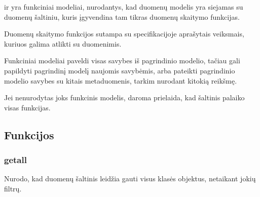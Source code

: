 \documentclass[letterpaper,10pt,lithuanian]{sphinxmanual}
\begin{document}
\sphinxAtStartPar
{} ir  yra funkciniai modeliai, nurodantys, kad
duomenų modelis  yra siejamas su duomenų šaltiniu, kuris įgyvendina tam
tikras duomenų skaitymo funkcijas.

\sphinxAtStartPar
Duomenų skaitymo funkcijos sutampa su  specifikacijoje aprašytais veiksmais,
kuriuos galima atlikti su duomenimis.

\sphinxAtStartPar
Funkciniai modeliai paveldi visas savybes iš pagrindinio modelio, tačiau gali
papildyti pagrindinį modelį naujomis savybėmis, arba pateikti pagrindinio
modelio savybes su kitais metaduomenis, tarkim nurodant kitokią
{\hyperref[\detokenize{dimensijos:property.source}]{}} reikšmę.

\sphinxAtStartPar
Jei nenurodytas joks funkcinis modelis, daroma prielaida, kad šaltinis palaiko
visas  funkcijas.


\subsection{Funkcijos}
\label{\detokenize{modeliai/funkciniai:funkcijos}}

\subsubsection{getall}
\label{\detokenize{modeliai/funkciniai:getall}}
\sphinxAtStartPar
Nurodo, kad duomenų šaltinis leidžia gauti visus klasės objektus, netaikant jokių filtrų.
\end{document}
